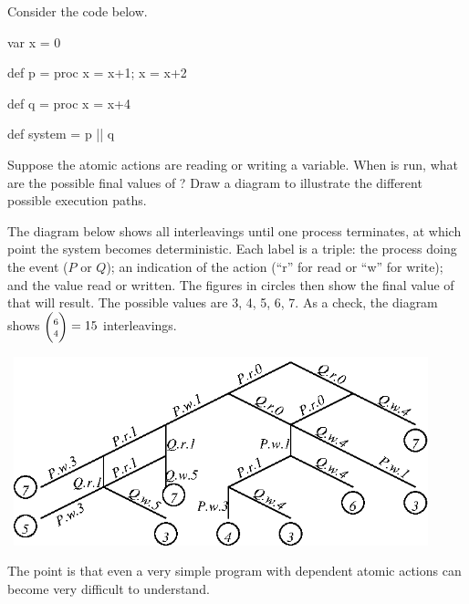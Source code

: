 \begin{question}
Consider the code below.
%
\begin{scala}
var x = 0

def p = proc{ x = x+1; x = x+2 }

def q = proc{ x = x+4 }

def system = p || q
\end{scala}
%
Suppose the atomic actions are reading or writing a variable.
When  is run, what are the possible final values of ?
Draw a diagram to illustrate the different possible execution paths.
\end{question}
%
\begin{answer}
The diagram below shows all interleavings until one process terminates, at
which point the system becomes deterministic.  Each label is a triple: the
process doing the event ($P$ or $Q$); an indication of the action (``r'' for
read or ``w'' for write); and the value read or written.  The figures in
circles then show the final value of  that will result.  The possible
values are 3, 4, 5, 6, 7.  As a check, the diagram shows 
\( {\scriptstyle
  \left( \begin{array}{@{}c@{}} \scriptstyle 6 \\[-1mm] \scriptstyle
    4 \end{array} \right)} = 15 \) interleavings.
%
\begin{center}
\ \includegraphics[width=12cm]{interleavings2.eps}\ 
\end{center}
%
The point is that even a very simple program with dependent atomic actions can
become very difficult to understand. 
\end{answer}
